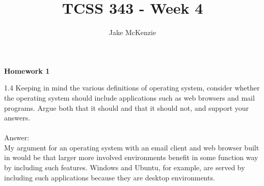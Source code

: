 \documentclass[12pt]{article}
\begin{document}
\title{TCSS 343 - Week 4}
\author{Jake McKenzie}
\maketitle
\noindent\centerline{\textbf{Homework 1}}
1.4 Keeping in mind the various definitions of operating system, consider
whether the operating system should include applications such as web
browsers and mail programs. Argue both that it should and that it
should not, and support your answers.\\\\

Answer: \\

My argument for an operating system with an email client and web browser built in 
would be that larger more involved environments benefit in some function 
way by including such features. Windows and Ubuntu, for example, are served by 
including such applications because they are desktop environments.  \\\\
\end{document}

